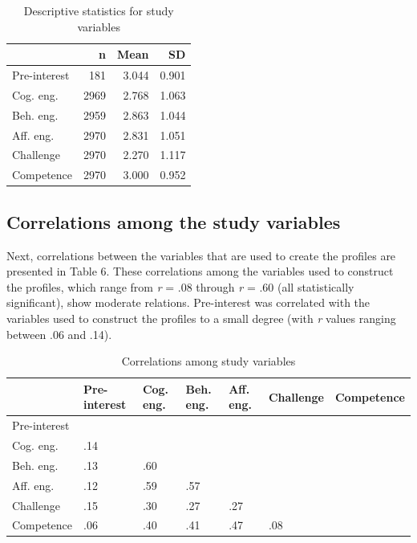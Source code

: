 \documentclass[]{book}
\theoremstyle{definition}
\theoremstyle{definition}
\theoremstyle{definition}
\theoremstyle{remark}
\begin{document}
\begin{table}

\caption{\label{tab:unnamed-chunk-7}Descriptive statistics for study variables}
\centering
\begin{tabular}[t]{lrrr}
\toprule
 & n & Mean & SD\\
\midrule
Pre-interest & 181 & 3.044 & 0.901\\
Cog. eng. & 2969 & 2.768 & 1.063\\
Beh. eng. & 2959 & 2.863 & 1.044\\
Aff. eng. & 2970 & 2.831 & 1.051\\
Challenge & 2970 & 2.270 & 1.117\\
Competence & 2970 & 3.000 & 0.952\\
\bottomrule
\end{tabular}
\end{table}

\subsection{Correlations among the study
variables}\label{correlations-among-the-study-variables}

Next, correlations between the variables that are used to create the
profiles are presented in Table 6. These correlations among the
variables used to construct the profiles, which range from \emph{r} =
.08 through \emph{r} = .60 (all statistically significant), show
moderate relations. Pre-interest was correlated with the variables used
to construct the profiles to a small degree (with \emph{r} values
ranging between .06 and .14).

\begin{landscape}\begin{table}

\caption{\label{tab:unnamed-chunk-8}Correlations among study variables}
\centering
\begin{tabular}[t]{lllllll}
\toprule
 & Pre-interest & Cog. eng. & Beh. eng. & Aff. eng. & Challenge & Competence\\
\midrule
Pre-interest &  &  &  &  &  & \\
Cog. eng. & .14 &  &  &  &  & \\
Beh. eng. & .13 & .60 &  &  &  & \\
Aff. eng. & .12 & .59 & .57 &  &  & \\
Challenge & .15 & .30 & .27 & .27 &  & \\
Competence & .06 & .40 & .41 & .47 & .08 & \\
\bottomrule
\end{tabular}
\end{table}
\end{landscape}
\end{document}
